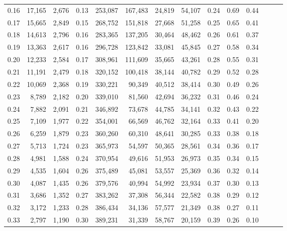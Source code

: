 \begin{tabular}{rrrrrrrrrrrrrr}
0.16 &  17,165 &  2,676 &  0.13 &  253,087 &  167,483 &  24,819 &  54,107 &  0.24 &  0.69 &      0.44 \\
0.17 &  15,665 &  2,849 &  0.15 &  268,752 &  151,818 &  27,668 &  51,258 &  0.25 &  0.65 &      0.41 \\
0.18 &  14,613 &  2,796 &  0.16 &  283,365 &  137,205 &  30,464 &  48,462 &  0.26 &  0.61 &      0.37 \\
0.19 &  13,363 &  2,617 &  0.16 &  296,728 &  123,842 &  33,081 &  45,845 &  0.27 &  0.58 &      0.34 \\
0.20 &  12,233 &  2,584 &  0.17 &  308,961 &  111,609 &  35,665 &  43,261 &  0.28 &  0.55 &      0.31 \\
0.21 &  11,191 &  2,479 &  0.18 &  320,152 &  100,418 &  38,144 &  40,782 &  0.29 &  0.52 &      0.28 \\
0.22 &  10,069 &  2,368 &  0.19 &  330,221 &   90,349 &  40,512 &  38,414 &  0.30 &  0.49 &      0.26 \\
0.23 &   8,789 &  2,182 &  0.20 &  339,010 &   81,560 &  42,694 &  36,232 &  0.31 &  0.46 &      0.24 \\
0.24 &   7,882 &  2,091 &  0.21 &  346,892 &   73,678 &  44,785 &  34,141 &  0.32 &  0.43 &      0.22 \\
0.25 &   7,109 &  1,977 &  0.22 &  354,001 &   66,569 &  46,762 &  32,164 &  0.33 &  0.41 &      0.20 \\
0.26 &   6,259 &  1,879 &  0.23 &  360,260 &   60,310 &  48,641 &  30,285 &  0.33 &  0.38 &      0.18 \\
0.27 &   5,713 &  1,724 &  0.23 &  365,973 &   54,597 &  50,365 &  28,561 &  0.34 &  0.36 &      0.17 \\
0.28 &   4,981 &  1,588 &  0.24 &  370,954 &   49,616 &  51,953 &  26,973 &  0.35 &  0.34 &      0.15 \\
0.29 &   4,535 &  1,604 &  0.26 &  375,489 &   45,081 &  53,557 &  25,369 &  0.36 &  0.32 &      0.14 \\
0.30 &   4,087 &  1,435 &  0.26 &  379,576 &   40,994 &  54,992 &  23,934 &  0.37 &  0.30 &      0.13 \\
0.31 &   3,686 &  1,352 &  0.27 &  383,262 &   37,308 &  56,344 &  22,582 &  0.38 &  0.29 &      0.12 \\
0.32 &   3,172 &  1,233 &  0.28 &  386,434 &   34,136 &  57,577 &  21,349 &  0.38 &  0.27 &      0.11 \\
0.33 &   2,797 &  1,190 &  0.30 &  389,231 &   31,339 &  58,767 &  20,159 &  0.39 &  0.26 &      0.10 \\

\end{tabular}
